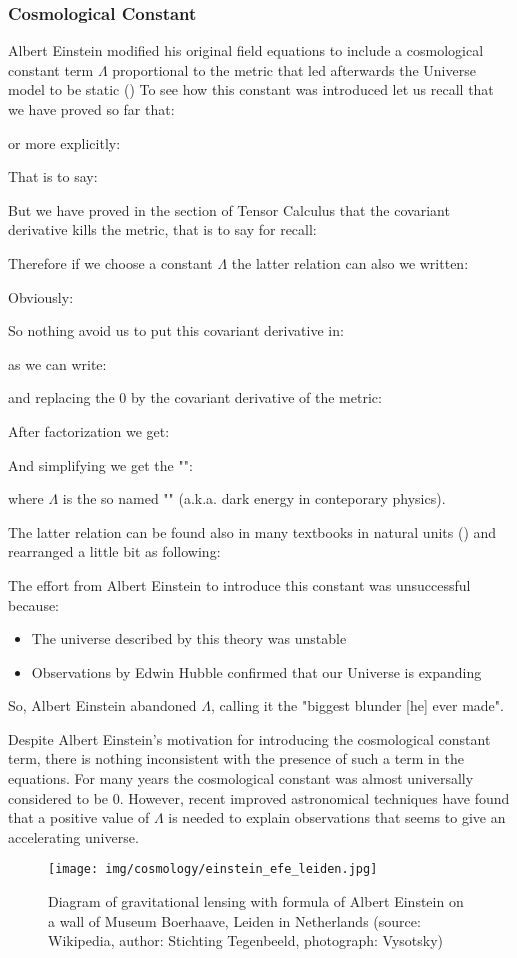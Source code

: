 	\pagebreak
	\subsubsection{Cosmological Constant}
	Albert Einstein modified his original field equations to include a cosmological constant term $\Lambda$ proportional to the metric that led afterwards the Universe model to be static ()
	To see how this constant was introduced let us recall that we have proved so far that:
	
	or more explicitly:
	
	That is to say:
	
	But we have proved in the section of Tensor Calculus that the covariant derivative kills the metric, that is to say for recall:
	
	Therefore if we choose a constant $\Lambda$ the latter relation can also we written:
	
	Obviously:
	
	So nothing avoid us to put this covariant derivative in:
	
	as we can write:
	
	and replacing the $0$ by the covariant derivative of the metric:
	
	After factorization we get:
	
	And simplifying we get the "":
	
	where $\Lambda$ is the so named "" (a.k.a. dark energy in conteporary physics).
	
	The latter relation can be found also in many textbooks in natural units () and rearranged a little bit as following:
	
	The effort from Albert Einstein to introduce this constant was unsuccessful because:
	\begin{itemize}
		\item The universe described by this theory was unstable
		\item Observations by Edwin Hubble confirmed that our Universe is expanding
	\end{itemize}
	So, Albert Einstein abandoned $\Lambda$, calling it the "biggest blunder [he] ever made".

		Despite Albert Einstein's motivation for introducing the cosmological constant term, there is nothing inconsistent with the presence of such a term in the equations. For many years the cosmological constant was almost universally considered to be $0$. However, recent improved astronomical techniques have found that a positive value of $\Lambda$  is needed to explain observations that seems to give an accelerating universe.	
	\begin{figure}[H]
		\centering
		\texttt{[image: img/cosmology/einstein\_efe\_leiden.jpg]}	
		\caption{Diagram of gravitational lensing  with formula of Albert Einstein on a wall of Museum Boerhaave, Leiden in Netherlands (source: Wikipedia, author: Stichting Tegenbeeld,  photograph: Vysotsky)}
	\end{figure}
	
